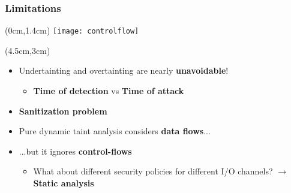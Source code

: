 \begin{frame}
	\frametitle{Limitations}
	\begin{textblock*}{5cm}(0cm,1.4cm)
		\texttt{[image: controlflow]}
	\end{textblock*}
	
	\begin{textblock*}{8cm}(4.5cm,3cm)
		\begin{itemize}
			\item Undertainting and overtainting are nearly \textbf{unavoidable}!
			\begin{itemize}
				\item \textbf{Time of detection} vs \textbf{Time of attack}
			\end{itemize}
			\item \textbf{Sanitization problem}
			\item Pure dynamic taint analysis considers \textbf{data flows}...
			\item<2-> ...but it ignores \textbf{control-flows}
			\begin{itemize}
				\item<2-> What about different security policies for different I/O channels?
					  \newline $\rightarrow$ \textbf{Static analysis}
			\end{itemize}
		\end{itemize}
	\end{textblock*}
\end{frame}